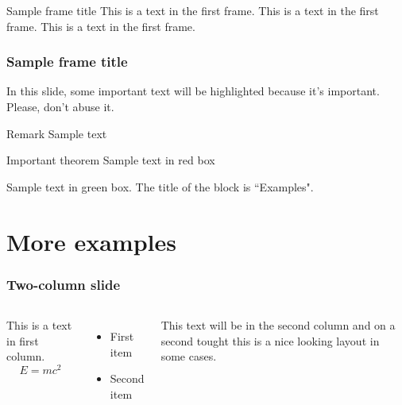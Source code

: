 \documentclass[11pt]{beamer}
\begin{document}
\begin{frame}{Sample frame title}
    This is a text in the first frame. This is a text in the first frame. This is a text in the first frame.
\end{frame}

\begin{frame}
\frametitle{Sample frame title}

In this slide, some important text will be
\alert{highlighted} because it's important.
Please, don't abuse it.

\begin{block}{Remark}
Sample text
\end{block}

\begin{alertblock}{Important theorem}
Sample text in red box
\end{alertblock}

\begin{examples}
Sample text in green box. The title of the block is ``Examples".
\end{examples}
\end{frame}

\section{More examples}

\begin{frame}
\frametitle{Two-column slide}

\begin{columns}

This is a text in first column.
$$E=mc^2$$
\begin{itemize}
\item First item
\item Second item
\end{itemize}

This text will be in the second column
and on a second tought this is a nice looking
layout in some cases.
\end{columns}
\end{frame}
\end{document}
